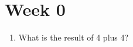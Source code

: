 \documentclass[a4paper,12pt]{CURSUS}
\newcommand{\BN}{\begin{enumerate}}
\newcommand{\EN}{\end{enumerate}}
\begin{document}
\addtocounter{chapter}{-1}
\renewcommand{\chaptername}{Assignment}
\chapter{Week 0}

 \BN

 \item

 \begin{center}

 What is the result of 4 plus 4?

 \end{center}

 \EN
\end{document}

